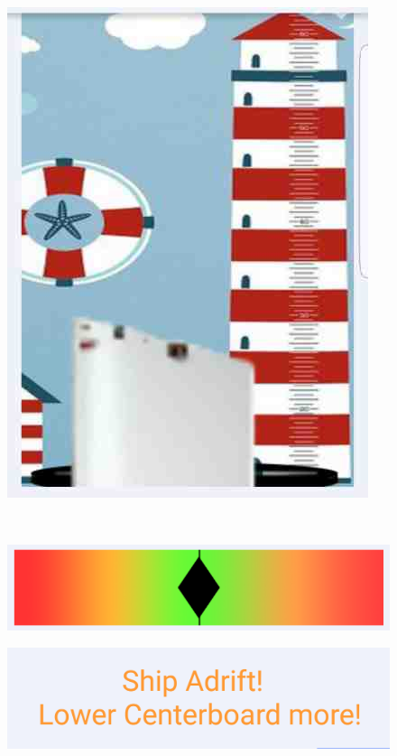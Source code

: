 \begin{figure}[H]
	\centering
	\begin{minipage}[c]{0.35\textwidth}
	\includegraphics[width=\textwidth]{Figures/height.jpg}
	\label{feedback-height}
	\end{minipage}
	~
	\begin{minipage}[c]{0.55\textwidth}
	\includegraphics[width=\textwidth]{Figures/drift.png}
	\label{feedback-drift}
	
	\includegraphics[width=\textwidth]{Figures/text.png}
	\label{feedback-text}
	\end{minipage}
\end{figure}
